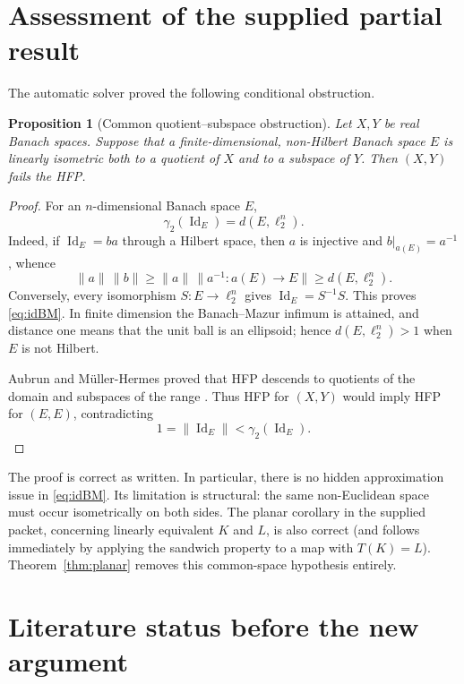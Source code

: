 \documentclass[11pt]{amsart}
\newtheorem{proposition}[theorem]{Proposition}
\theoremstyle{definition}
\theoremstyle{remark}
\newcommand{\Id}{\operatorname{Id}}
\newcommand{\ga}{\gamma_2}
\begin{document}
\section{Assessment of the supplied partial result}\label{sec:partial}

The automatic solver proved the following conditional obstruction.

\begin{proposition}[Common quotient--subspace obstruction]\label{prop:partial}
Let $X,Y$ be real Banach spaces.  Suppose that a finite-dimensional,
non-Hilbert Banach space $E$ is linearly isometric both to a quotient of $X$
and to a subspace of $Y$.  Then $(X,Y)$ fails the HFP.
\end{proposition}

\begin{proof}
For an $n$-dimensional Banach space $E$,
\begin{equation}\label{eq:idBM}
 \ga(\Id_E)=d(E,\ell_2^n).
\end{equation}
Indeed, if $\Id_E=ba$ through a Hilbert space, then $a$ is injective and
$b|_{a(E)}=a^{-1}$, whence
\[
 \|a\|\,\|b\|\geq \|a\|\,\|a^{-1}:a(E)\to E\|\geq d(E,\ell_2^n).
\]
Conversely, every isomorphism $S:E\to\ell_2^n$ gives
$\Id_E=S^{-1}S$.  This proves \eqref{eq:idBM}.  In finite dimension the
Banach--Mazur infimum is attained, and distance one means that the unit ball is
an ellipsoid; hence $d(E,\ell_2^n)>1$ when $E$ is not Hilbert.

Aubrun and M\"uller-Hermes proved that HFP descends to quotients of the domain
and subspaces of the range \cite[Proposition 5.4]{AMH-limit}.  Thus HFP for
$(X,Y)$ would imply HFP for $(E,E)$, contradicting
\[
 1=\|\Id_E\|<\ga(\Id_E).
\]
\end{proof}

The proof is correct as written.  In particular, there is no hidden
approximation issue in \eqref{eq:idBM}.  Its limitation is structural: the
same non-Euclidean space must occur isometrically on both sides.  The planar
corollary in the supplied packet, concerning linearly equivalent $K$ and $L$,
is also correct (and follows immediately by applying the sandwich property to
a map with $T(K)=L$).  Theorem~\ref{thm:planar} removes this common-space
hypothesis entirely.

\section{Literature status before the new argument}\label{sec:literature}
\end{document}
